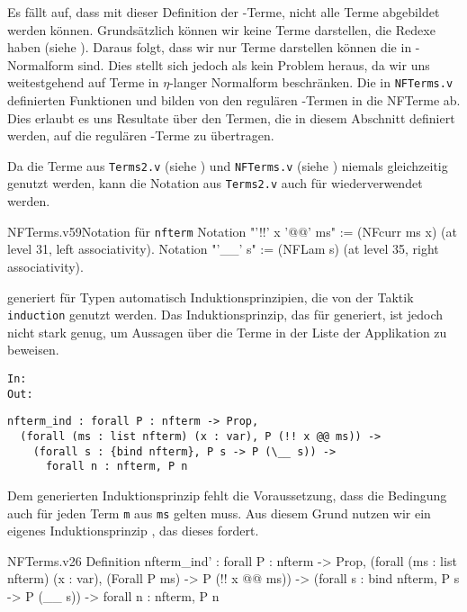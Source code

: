 Es fällt auf, dass mit dieser Definition der \tlambda-Terme, nicht alle Terme abgebildet werden können. Grundsätzlich können wir keine Terme darstellen, die Redexe haben (siehe ). Daraus folgt, dass wir nur Terme darstellen können die in \tbeta-Normalform sind. Dies stellt sich jedoch als kein Problem heraus, da wir uns weitestgehend auf Terme in $\eta$-langer Normalform beschränken. Die in \texttt{NFTerms.v} definierten Funktionen  und  bilden von den regulären \tlambda-Termen in die NFTerme ab. Dies erlaubt es uns Resultate über den Termen, die in diesem Abschnitt definiert werden, auf die regulären \tlambda-Terme zu übertragen. %

Da die Terme aus \texttt{Terms2.v} (siehe ) und \texttt{NFTerms.v} (siehe ) niemals gleichzeitig genutzt werden, kann die Notation aus \texttt{Terms2.v} auch für  wiederverwendet werden.
\begin{ccode}[nftermnot]{NFTerms.v}{}{59}{Notation für \texttt{nfterm}}
Notation "'!!' x '@@' ms" := (NFcurr ms x) 
  (at level 31, left associativity).
Notation "'\__' s" := (NFLam s) 
  (at level 35, right associativity).
\end{ccode}

\coq{} generiert für Typen automatisch Induktionsprinzipien, die von der Taktik \texttt{induction} genutzt werden. Das Induktionsprinzip, das \coq{} für  generiert, ist jedoch nicht stark genug, um Aussagen über die Terme in der Liste der Applikation zu beweisen.
    \begin{icode}
        \texttt{In:} \\
         \texttt{Out:} 
         \begin{verbatim}
nfterm_ind : forall P : nfterm -> Prop,
  (forall (ms : list nfterm) (x : var), P (!! x @@ ms)) ->
    (forall s : {bind nfterm}, P s -> P (\__ s)) ->
      forall n : nfterm, P n                        
            \end{verbatim}
    \end{icode}
Dem generierten Induktionsprinzip fehlt die Voraussetzung, dass die Bedingung  auch für jeden Term \texttt{m} aus \texttt{ms} gelten muss. Aus diesem Grund nutzen wir ein eigenes Induktionsprinzip , das dieses fordert.
\begin{code}{NFTerms.v}{}{26}
Definition nfterm_ind' : forall P : nfterm -> Prop,
    (forall (ms : list nfterm) (x : var), 
      (Forall P ms) -> P (!! x @@ ms)) ->
        (forall s : {bind nfterm}, P s -> P (\__ s)) -> 
          forall n : nfterm, P n
\end{code}

